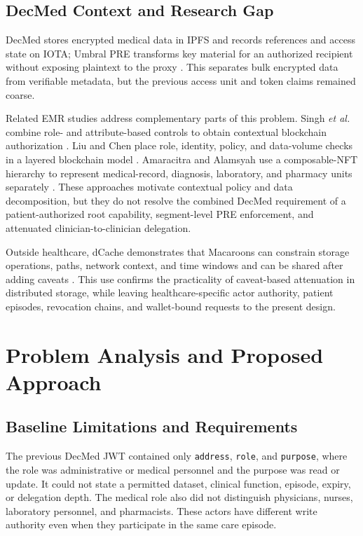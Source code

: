 \documentclass[conference,a4paper,english]{IEEEtran}
\begin{document}
\subsection{DecMed Context and Research Gap}

DecMed stores encrypted medical data in IPFS and records references and access state on IOTA; Umbral PRE transforms key material for an authorized recipient without exposing plaintext to the proxy \cite{sadewa2025decmed,benet2014ipfs,nunez2017umbral}. This separates bulk encrypted data from verifiable metadata, but the previous access unit and token claims remained coarse.

Related EMR studies address complementary parts of this problem. Singh \emph{et al.} combine role- and attribute-based controls to obtain contextual blockchain authorization \cite{singh2025granular}. Liu and Chen place role, identity, policy, and data-volume checks in a layered blockchain model \cite{liu2025accesscontrol}. Amaracitra and Alamsyah use a composable-NFT hierarchy to represent medical-record, diagnosis, laboratory, and pharmacy units separately \cite{amaracitra2025composable}. These approaches motivate contextual policy and data decomposition, but they do not resolve the combined DecMed requirement of a patient-authorized root capability, segment-level PRE enforcement, and attenuated clinician-to-clinician delegation.

Outside healthcare, dCache demonstrates that Macaroons can constrain storage operations, paths, network context, and time windows and can be shared after adding caveats \cite{dcache_macaroons}. This use confirms the practicality of caveat-based attenuation in distributed storage, while leaving healthcare-specific actor authority, patient episodes, revocation chains, and wallet-bound requests to the present design.

\section{Problem Analysis and Proposed Approach}
\label{sec:approach}

\subsection{Baseline Limitations and Requirements}

The previous DecMed JWT contained only \texttt{address}, \texttt{role}, and \texttt{purpose}, where the role was administrative or medical personnel and the purpose was read or update. It could not state a permitted dataset, clinical function, episode, expiry, or delegation depth. The medical role also did not distinguish physicians, nurses, laboratory personnel, and pharmacists. These actors have different write authority even when they participate in the same care episode.
\end{document}
